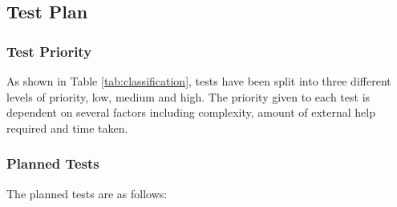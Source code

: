 
\pagebreak
\subsection{Test Plan}

\subsubsection{Test Priority} \label{sec:5.2.1-testpriority}
As shown in Table \ref{tab:classification}, tests have been split into three different levels of priority, low, medium and high. The priority given to each test is dependent on several factors including complexity, amount of external help required and time taken. 



\subsubsection{Planned Tests}
The planned tests are as follows:


